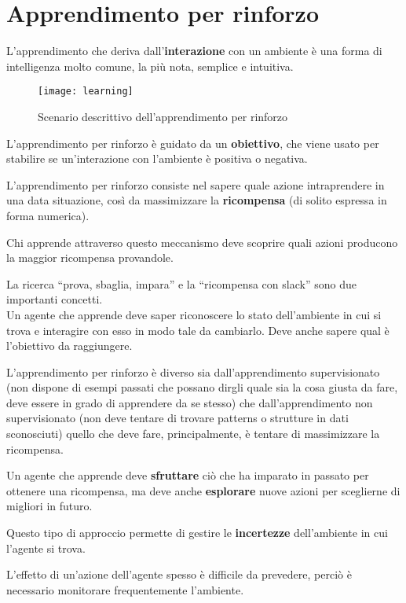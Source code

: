 \newpage
\section{Apprendimento per rinforzo}

L'apprendimento che deriva dall'\textbf{interazione} con un ambiente è una
forma di intelligenza molto comune, la più nota, semplice e intuitiva.

\begin{figure}[H]
\caption{Scenario descrittivo dell'apprendimento per rinforzo}
\centering
\texttt{[image: learning]}
\end{figure}

L'apprendimento per rinforzo è guidato da un \textbf{obiettivo}, che viene
usato per stabilire se un'interazione con l'ambiente è positiva o negativa.

L'apprendimento per rinforzo consiste nel sapere quale azione intraprendere in
una data situazione, così da massimizzare la \textbf{ricompensa} (di solito
espressa in forma numerica).

Chi apprende attraverso questo meccanismo deve scoprire quali azioni producono
la maggior ricompensa provandole.

La ricerca ``prova, sbaglia, impara'' e la ``ricompensa con slack'' sono due
importanti concetti.\\

Un agente che apprende deve saper riconoscere lo stato dell'ambiente in cui si trova
e interagire con esso in modo tale da cambiarlo. Deve anche sapere qual è
l'obiettivo da raggiungere.

L'apprendimento per rinforzo è diverso sia dall'apprendimento supervisionato (non
dispone di esempi passati che possano dirgli quale sia la cosa giusta da fare, deve
essere in grado di apprendere da se stesso) che dall'apprendimento non supervisionato
(non deve tentare di trovare patterns o strutture in dati sconosciuti) quello che
deve fare, principalmente, è tentare di massimizzare la ricompensa.

Un agente che apprende deve \textbf{sfruttare} ciò che ha imparato in passato per
ottenere una ricompensa, ma deve anche \textbf{esplorare} nuove azioni per sceglierne
di migliori in futuro.

Questo tipo di approccio permette di gestire le \textbf{incertezze} dell'ambiente in
cui l'agente si trova.

L'effetto di un'azione dell'agente spesso è difficile da prevedere, perciò è necessario
monitorare frequentemente l'ambiente.

